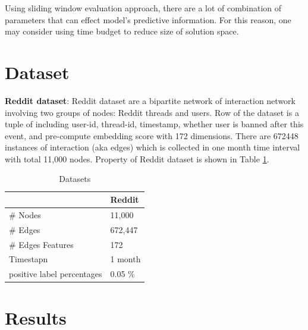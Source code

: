 \documentclass{IEEEtran}
\begin{document}
Using sliding window evaluation approach, there are a lot of combination of parameters that can effect model's predictive information. For this reason, one may consider using time budget to reduce size of solution space.
\section{Dataset}
\label{sec:org6573d46}
\textbf{Reddit dataset}: Reddit dataset are a bipartite network of interaction network involving two groups of nodes: Reddit threads and users. Row of the dataset is a tuple of including user-id, thread-id, timestamp, whether user is banned after this event, and pre-compute embedding score with 172 dimensions. There are 672448 instances of interaction (aka edges) which is collected in one month time interval with total 11,000 nodes. Property of Reddit dataset is shown in Table \ref{Datasets}.

\begin{table}[htbp]
\caption{\label{Datasets}Datasets}
\centering
\begin{tabular}{ll}
\hline
\hline
 & Reddit\\
\hline
\# Nodes & 11,000\\
\# Edges & 672,447\\
\# Edges Features & 172\\
Timestapn & 1 month\\
positive label percentages & 0.05 \%\\
\end{tabular}
\end{table}
\section{Results}
\label{sec:orge5bf07e}
\printbibliography
\end{document}

